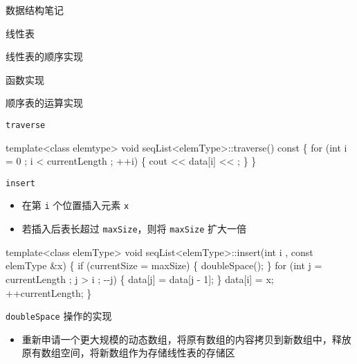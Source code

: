\documentclass[
  ignorenonframetext,
]{beamer}
\newenvironment{Shaded}{}{}
\newcommand{\NormalTok}[1]{#1}
\providecommand{\tightlist}{%
  \setlength{\itemsep}{0pt}\setlength{\parskip}{0pt}}
\begin{document}
\begin{frame}[fragile]{数据结构笔记}
\begin{block}{线性表}
\begin{block}{线性表的顺序实现}
\begin{block}{函数实现}
\begin{block}{顺序表的运算实现}
\begin{block}{\texttt{traverse}}
\begin{Shaded}
\begin{Highlighting}[]
\NormalTok{template\textless{}class elemtype\textgreater{}}
\NormalTok{void seqList\textless{}elemType\textgreater{}::traverse() const}
\NormalTok{\{}
\NormalTok{  for (int i = 0 ; i \textless{} currentLength ; ++i)}
\NormalTok{  \{}
\NormalTok{    cout \textless{}\textless{} data[i] \textless{}\textless{} \textquotesingle{} \textquotesingle{};}
\NormalTok{  \}}
\NormalTok{\}}
\end{Highlighting}
\end{Shaded}
\end{block}

\begin{block}{\texttt{insert}}
\protect{}\label{insert}
\begin{itemize}
\tightlist
\item
  在第 \texttt{i} 个位置插入元素 \texttt{x}
\item
  若插入后表长超过 \texttt{maxSize}，则将 \texttt{maxSize} 扩大一倍
\end{itemize}


\begin{Shaded}
\begin{Highlighting}[]
\NormalTok{template\textless{}class elemType\textgreater{}}
\NormalTok{void seqList\textless{}elemType\textgreater{}::insert(int i , const elemType \&x)}
\NormalTok{\{}
\NormalTok{  if (currentSize = maxSize)}
\NormalTok{  \{}
\NormalTok{    doubleSpace();}
\NormalTok{  \}}
\NormalTok{  for (int j = currentLength ; j \textgreater{} i ; {-}{-}j)}
\NormalTok{  \{}
\NormalTok{    data[j] = data[j {-} 1];}
\NormalTok{  \}}
\NormalTok{  data[i] = x;}
\NormalTok{  ++currentLength;}
\NormalTok{\}}
\end{Highlighting}
\end{Shaded}
\end{block}

\begin{block}{\texttt{doubleSpace} 操作的实现}
\protect{}\label{doublespace-ux64cdux4f5cux7684ux5b9eux73b0}
\begin{itemize}
\tightlist
\item
  重新申请一个更大规模的动态数组，将原有数组的内容拷贝到新数组中，释放原有数组空间，将新数组作为存储线性表的存储区
\end{itemize}



\end{block}
\end{block}
\end{block}
\end{block}
\end{block}
\end{frame}
\end{document}
